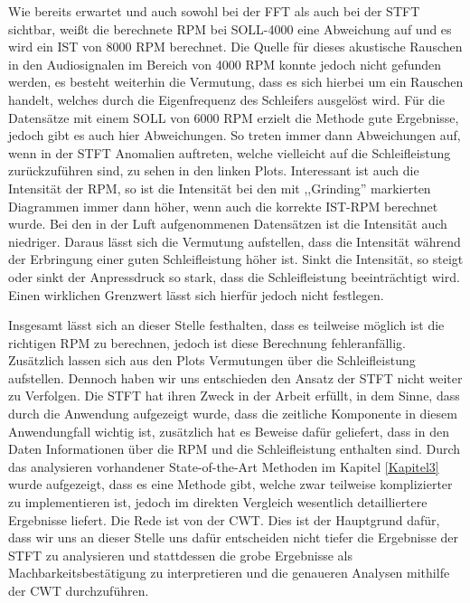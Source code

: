 Wie bereits erwartet und auch sowohl bei der \ac{FFT} als auch bei der \ac{STFT} sichtbar, weißt die berechnete RPM bei SOLL-4000 eine Abweichung auf und es wird ein IST von 8000 RPM berechnet. Die Quelle für dieses akustische Rauschen in den Audiosignalen im Bereich von 4000 RPM konnte jedoch nicht gefunden werden, es besteht weiterhin die Vermutung, dass es sich hierbei um ein Rauschen handelt, welches durch die Eigenfrequenz des Schleifers ausgelöst wird. Für die Datensätze mit einem SOLL von 6000 RPM erzielt die Methode gute Ergebnisse, jedoch gibt es auch hier Abweichungen. So treten immer dann Abweichungen auf, wenn in der \ac{STFT} Anomalien auftreten, welche vielleicht auf die Schleifleistung zurückzuführen sind, zu sehen in den linken Plots. Interessant ist auch die Intensität der RPM, so ist die Intensität bei den mit ,,Grinding'' markierten Diagrammen immer dann höher, wenn auch die korrekte IST-RPM berechnet wurde. Bei den in der Luft aufgenommenen Datensätzen ist die Intensität auch niedriger. Daraus lässt sich die Vermutung aufstellen, dass die Intensität während der Erbringung einer guten Schleifleistung höher ist. Sinkt die Intensität, so steigt oder sinkt der Anpressdruck so stark, dass die Schleifleistung beeinträchtigt wird. Einen wirklichen Grenzwert lässt sich hierfür jedoch nicht festlegen.

Insgesamt lässt sich an dieser Stelle festhalten, dass es teilweise möglich ist die richtigen RPM zu berechnen, jedoch ist diese Berechnung fehleranfällig. Zusätzlich lassen sich aus den Plots Vermutungen über die Schleifleistung aufstellen. Dennoch haben wir uns entschieden den Ansatz der \ac{STFT} nicht weiter zu Verfolgen. Die \ac{STFT} hat ihren Zweck in der Arbeit erfüllt, in dem Sinne, dass durch die Anwendung aufgezeigt wurde, dass die zeitliche Komponente in diesem Anwendungfall wichtig ist, zusätzlich hat es Beweise dafür geliefert, dass in den Daten Informationen über die RPM und die Schleifleistung enthalten sind. Durch das analysieren vorhandener State-of-the-Art Methoden im Kapitel \ref{Kapitel3} wurde aufgezeigt, dass es eine Methode gibt, welche zwar teilweise komplizierter zu implementieren ist, jedoch im direkten Vergleich wesentlich detailliertere Ergebnisse liefert. Die Rede ist von der \ac{CWT}. Dies ist der Hauptgrund dafür, dass wir uns an dieser Stelle uns dafür entscheiden nicht tiefer die Ergebnisse der \ac{STFT} zu analysieren und stattdessen die grobe Ergebnisse als Machbarkeitsbestätigung zu interpretieren und die genaueren Analysen mithilfe der \ac{CWT} durchzuführen. 


